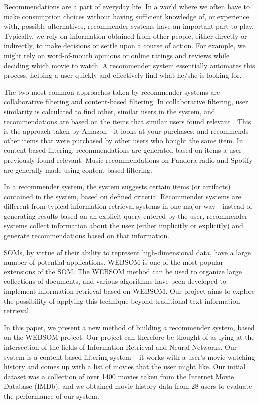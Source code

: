 \documentclass[conference]{IEEEtran}
\begin{document}
Recommendations are a part of everyday life. In a world where we often have to make consumption choices without having sufficient knowledge of, or experience with, possible alternatives, recommender systems have an important part to play. Typically, we rely on information obtained from other people, either directly or indirectly, to make decisions or settle upon a course of action. For example, we might rely on word-of-mouth opinions or online ratings and reviews while deciding which movie to watch. A recommender system essentially automates this process, helping a user quickly and effectively find what he/she is looking for.

The two most common approaches taken by recommender systems are collaborative filtering and content-based filtering. In collaborative filtering, user similarity is calculated to find other, similar users in the system, and recommendations are based on the items that similar users found relevant . This is the approach taken by Amazon - it looks at your purchases, and recommends other items that were purchased by other users who bought the same item. In content-based filtering, recommendations are generated based on items a user previously found relevant. Music recommendations on Pandora radio and Spotify are generally made using content-based filtering.

In a recommender system, the system suggests certain items (or artifacts) contained in the system, based on defined criteria. Recommender systems are different from typical information retrieval systems in one major way - instead of generating results based on an explicit query entered by the user, recommender systems collect information about the user (either implicitly or explicitly) and generate recommendations based on that information.

SOMs, by virtue of their ability to represent high-dimensional data, have a large number of potential applications. WEBSOM \cite{kaski1998websom} is one of the most popular extensions of the SOM. The WEBSOM method can be used to organize large collections of documents, and various algorithms have been developed to implement information retrieval based on WEBSOM. Our project aims to explore the possibility of applying this technique beyond traditional text information retrieval.

In this paper, we present a new method of building a recommender system, based on the WEBSOM project. Our project can therefore be thought of as lying at the intersection of the fields of Information Retrieval and Neural Networks. Our system is a content-based filtering system – it works with a user's movie-watching history and comes up with a list of movies that the user might like. Our initial dataset was a collection of over 1400 movies taken from the Internet Movie Database (IMDb), and we obtained movie-history data from 28 users to evaluate the performance of our system.
\end{document}
